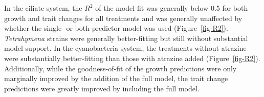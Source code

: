 \documentclass[
  letterpaper,
  DIV=11,
  numbers=noendperiod]{scrartcl}
\begin{document}
In the ciliate system, the \(R^2\) of the model fit was generally below
0.5 for both growth and trait changes for all treatments and was
generally unaffected by whether the single- or both-predictor model was
used (Figure~\ref{fig-R2}). \emph{Tetrahymena} strains were generally
better-fitting but still without substantial model support. In the
cyanobacteria system, the treatments without atrazine were substantially
better-fitting than those with atrazine added (Figure~\ref{fig-R2}).
Additionally, while the goodness-of-fit of the growth predictions were
only marginally improved by the addition of the full model, the trait
change predictions were greatly improved by including the full model.
\end{document}
